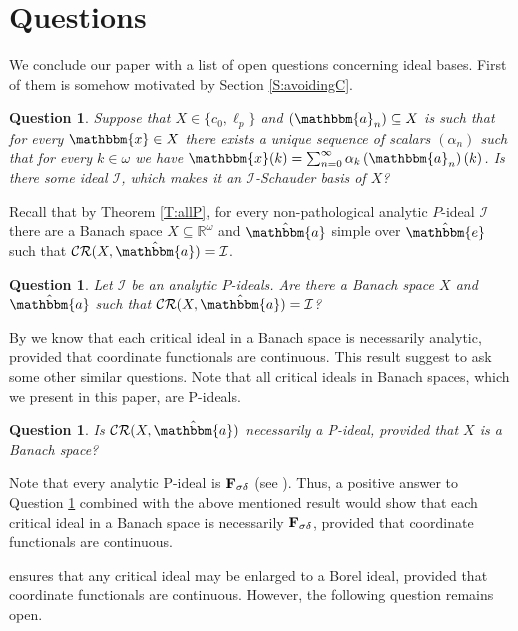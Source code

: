 \documentclass{amsart}
\newcommand{\I}{\mathcal{I}}
\newcommand{\CR}{\mathcal{CR}}
\newcommand{\w}{\mathbbm}
\newtheorem{question}[theorem]{Question}
\begin{document}
\section{Questions}
We conclude our paper with a list of open questions concerning ideal bases. First of them is somehow motivated by Section \ref{S:avoidingC}.

\begin{question}
    Suppose that $X\in \{c_0, \ell_p\}$ and $(\w{a}_n)\subseteq X$ is such that for every $\w{x}\in X$ there exists a unique sequence of scalars $(\alpha_{n})$ such that for every $k \in \omega$ we have $\w{x}(k)=\sum_{n=0}^\infty \alpha_{k} \left(\w{a}_n\right) (k)$. Is there some ideal $\I$, which makes it an $\I$-Schauder basis of $X$? 
\end{question}

Recall that by Theorem \ref{T:allP}, for every non-pathological analytic $P$-ideal $\I$ there are a Banach space $X\subseteq\mathbb{R}^\omega$ and $\hat{\w{a}}$ simple over $\hat{\w{e}}$ such that $\CR(X,\hat{\w{a}})=\I$.

\begin{question}
Let $\I$ be an analytic $P$-ideals. Are there a Banach space $X$ and $\hat{\w{a}}$ such that $\CR(X,\hat{\w{a}})=\I$? 
\end{question}

By \cite[Theorem B]{RKS} we know that each critical ideal in a Banach space is necessarily analytic, provided that coordinate functionals are continuous. This result suggest to ask some other similar questions. Note that all critical ideals in Banach spaces, which we present in this paper, are P-ideals.

\begin{question}
\label{q1}
Is $\CR(X,\hat{\w{a}})$ necessarily a P-ideal, provided that $X$ is a Banach space?
\end{question}

Note that every analytic P-ideal is $\bf{F_{\sigma\delta}}$ (see \cite[Lemma 1.2.2 and Theorem 1.2.5]{Farah}). Thus, a positive answer to Question \ref{q1} combined with the above mentioned result \cite[Theorem B]{RKS} would show that each critical ideal in a Banach space is necessarily $\bf{F_{\sigma\delta}}$, provided that coordinate functionals are continuous.

\cite[Theorem 1.18]{ARTT} ensures that any critical ideal may be enlarged to a Borel ideal, provided that coordinate functionals are continuous. However, the following question remains open.
\end{document}
